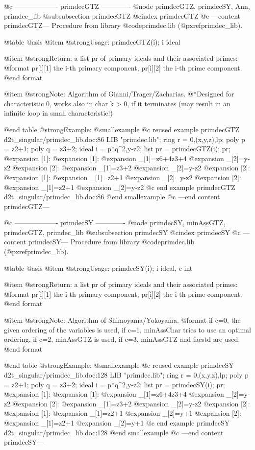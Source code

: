 @c ------------------- primdecGTZ -------------
@node primdecGTZ, primdecSY, Ann, primdec_lib
@subsubsection primdecGTZ
@cindex primdecGTZ
@c ---content primdecGTZ---
Procedure from library @code{primdec.lib} (@pxref{primdec_lib}).

@table @asis
@item @strong{Usage:}
primdecGTZ(i); i ideal

@item @strong{Return:}
a list pr of primary ideals and their associated primes:
@format
   pr[i][1]   the i-th primary component,
   pr[i][2]   the i-th prime component.
@end format

@item @strong{Note:}
Algorithm of Gianni/Trager/Zacharias.
@*Designed for characteristic 0, works also in char k > 0, if it
terminates (may result in an infinite loop in small characteristic!)

@end table
@strong{Example:}
@smallexample
@c reused example primdecGTZ d2t_singular/primdec_lib.doc:86 
LIB "primdec.lib";
ring  r = 0,(x,y,z),lp;
poly  p = z2+1;
poly  q = z3+2;
ideal i = p*q^2,y-z2;
list pr = primdecGTZ(i);
pr;
@expansion{} [1]:
@expansion{}    [1]:
@expansion{}       _[1]=z6+4z3+4
@expansion{}       _[2]=y-z2
@expansion{}    [2]:
@expansion{}       _[1]=z3+2
@expansion{}       _[2]=y-z2
@expansion{} [2]:
@expansion{}    [1]:
@expansion{}       _[1]=z2+1
@expansion{}       _[2]=y-z2
@expansion{}    [2]:
@expansion{}       _[1]=z2+1
@expansion{}       _[2]=y-z2
@c end example primdecGTZ d2t_singular/primdec_lib.doc:86
@end smallexample
@c ---end content primdecGTZ---

@c ------------------- primdecSY -------------
@node primdecSY, minAssGTZ, primdecGTZ, primdec_lib
@subsubsection primdecSY
@cindex primdecSY
@c ---content primdecSY---
Procedure from library @code{primdec.lib} (@pxref{primdec_lib}).

@table @asis
@item @strong{Usage:}
primdecSY(i); i ideal, c int

@item @strong{Return:}
a list pr of primary ideals and their associated primes:
@format
   pr[i][1]   the i-th primary component,
   pr[i][2]   the i-th prime component.
@end format

@item @strong{Note:}
Algorithm of Shimoyama/Yokoyama.
@format
   if c=0,  the given ordering of the variables is used,
   if c=1,  minAssChar tries to use an optimal ordering,
   if c=2,  minAssGTZ is used,
   if c=3,  minAssGTZ and facstd are used.
@end format

@end table
@strong{Example:}
@smallexample
@c reused example primdecSY d2t_singular/primdec_lib.doc:128 
LIB "primdec.lib";
ring  r = 0,(x,y,z),lp;
poly  p = z2+1;
poly  q = z3+2;
ideal i = p*q^2,y-z2;
list pr = primdecSY(i);
pr;
@expansion{} [1]:
@expansion{}    [1]:
@expansion{}       _[1]=z6+4z3+4
@expansion{}       _[2]=y-z2
@expansion{}    [2]:
@expansion{}       _[1]=z3+2
@expansion{}       _[2]=y-z2
@expansion{} [2]:
@expansion{}    [1]:
@expansion{}       _[1]=z2+1
@expansion{}       _[2]=y+1
@expansion{}    [2]:
@expansion{}       _[1]=z2+1
@expansion{}       _[2]=y+1
@c end example primdecSY d2t_singular/primdec_lib.doc:128
@end smallexample
@c ---end content primdecSY---

